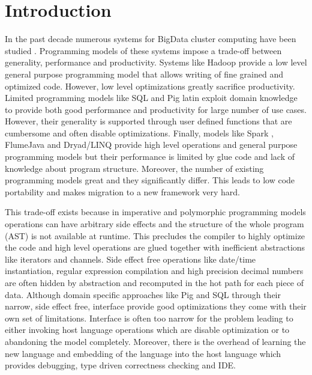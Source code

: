 \section{Introduction}
\label{sec:introduction}

In the past decade numerous systems for BigData cluster computing have been studied \cite{dean_mapreduce:_2008, yu_dryadlinq:_2008-1, olston_pig_2008-1, thusoo_hive_2010-1, zaharia_spark:_2010}. Programming models of these systems impose a trade-off between generality, performance and productivity. Systems like Hadoop \cite{_hadoop_????} provide a low level general purpose programming model that allows writing of fine grained and optimized code.  However, low level optimizations greatly sacrifice productivity. Limited programming models like SQL and Pig latin \cite{olston_pig_2008-1} exploit domain knowledge to provide both good performance and productivity for large number of use cases. However, their generality is supported through user defined functions that are cumbersome and often disable optimizations. Finally, models like Spark \cite{zaharia_spark:_2010}, FlumeJava \cite{chambers_flumejava:_2010} and Dryad/LINQ \cite{yu_dryadlinq:_2008-1} provide high level operations and general purpose programming models but their performance is limited by glue code and lack of knowledge about program structure. Moreover, the number of existing programming models great and they significantly differ. This leads to low code portability and makes migration to a new framework very hard. 

This trade-off exists because in imperative and polymorphic programming models operations can have arbitrary side effects and the structure of the whole program (AST) is not available at runtime. This precludes the compiler to highly optimize the code and high level operations are glued together with inefficient abstractions like iterators and channels. Side effect free operations like date/time instantiation, regular expression compilation and high precision decimal numbers are often hidden by abstraction and recomputed in the hot path for each piece of data. Although domain specific approaches like Pig and SQL through their narrow, side effect free, interface provide good optimizations they come with their own set of limitations. Interface is often too narrow for the problem leading to either invoking host language operations which are disable optimization or to abandoning the model completely. Moreover, there is the overhead of learning the new language and embedding of the language into the host language which provides debugging, type driven correctness checking and IDE.     

